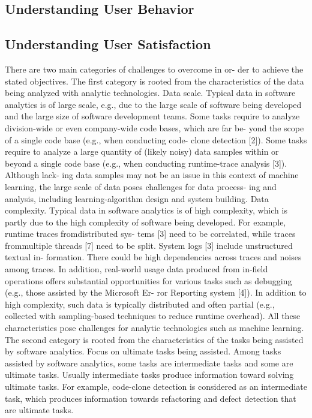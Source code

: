 \subsection{Understanding User Behavior}


\subsection{Understanding User Satisfaction}
There are two main categories of challenges to overcome in or-
der to achieve the stated objectives. The first category is rooted from the characteristics of the data being analyzed with analytic technologies. Data scale. Typical data in software analytics is of large scale,
e.g., due to the large scale of software being developed and the large size of software development teams. Some tasks require to analyze division-wide or even company-wide code bases, which are far be- yond the scope of a single code base (e.g., when conducting code- clone detection [2]). Some tasks require to analyze a large quantity of (likely noisy) data samples within or beyond a single code base (e.g., when conducting runtime-trace analysis [3]). Although lack- ing data samples may not be an issue in this context of machine learning, the large scale of data poses challenges for data process- ing and analysis, including learning-algorithm design and system building. Data complexity. Typical data in software analytics is of high
complexity, which is partly due to the high complexity of software being developed. For example, runtime traces fromdistributed sys- tems [3] need to be correlated, while traces frommultiple threads [7] need to be split. System logs [3] include unstructured textual in- formation. There could be high dependencies across traces and noises among traces. In addition, real-world usage data produced from in-field operations offers substantial opportunities for various tasks such as debugging (e.g., those assisted by the Microsoft Er- ror Reporting system [4]). In addition to high complexity, such data is typically distributed and often partial (e.g., collected with sampling-based techniques to reduce runtime overhead). All these characteristics pose challenges for analytic technologies such as machine learning. The second category is rooted from the characteristics of the
tasks being assisted by software analytics. Focus on ultimate tasks being assisted. Among tasks assisted
by software analytics, some tasks are intermediate tasks and some are ultimate tasks. Usually intermediate tasks produce information toward solving ultimate tasks. For example, code-clone detection is considered as an intermediate task, which produces information towards refactoring and defect detection that are ultimate tasks.

